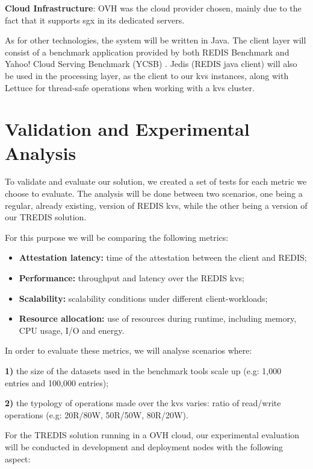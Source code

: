 \textbf{Cloud Infrastructure}: OVH \cite{ovhCloud} was the cloud provider chosen, mainly due to the fact that it supports \gls{sgx} in its dedicated servers.

As for other technologies, the system will be written in Java. 
The client layer will consist of a benchmark application provided by both REDIS Benchmark and Yahoo! Cloud Serving Benchmark (YCSB) \cite{ycsb}. 
Jedis (REDIS java client) \cite{jedis} will also be used in the processing layer, as the client to our \gls{kvs} instances, along with Lettuce \cite{lettuce} for thread-safe operations when working with a \gls{kvs} cluster.


\section{Validation and Experimental Analysis} %
\label{sec:floats_figures_and_captions}

To validate and evaluate our solution, we created a set of tests for each metric we choose to evaluate. The analysis will be done between two scenarios, one being a regular, already existing, version of REDIS \gls{kvs}, while the other being a version of our TREDIS solution.

For this purpose we will be comparing the following metrics:

\begin{itemize}
	\item \textbf{Attestation latency:} time of the attestation between the client and REDIS;
	\item \textbf{Performance:} throughput and latency over the REDIS \gls{kvs};
	\item \textbf{Scalability:} scalability conditions under different client-workloads;
	\item \textbf{Resource allocation:} use of resources during runtime, including memory, CPU usage, I/O and energy.
\end{itemize}

In order to evaluate these metrics, we will analyse scenarios where:

\textbf{1)} the size of the datasets used in the benchmark tools scale up (e.g: 1,000 entries and 100,000 entries);

\textbf{2)} the typology of operations made over the \gls{kvs} varies: ratio of read/write operations (e.g: 20R/80W, 50R/50W, 80R/20W).


For the TREDIS solution running in a OVH cloud, our experimental evaluation will be conducted in development and deployment nodes with the following aspect:

